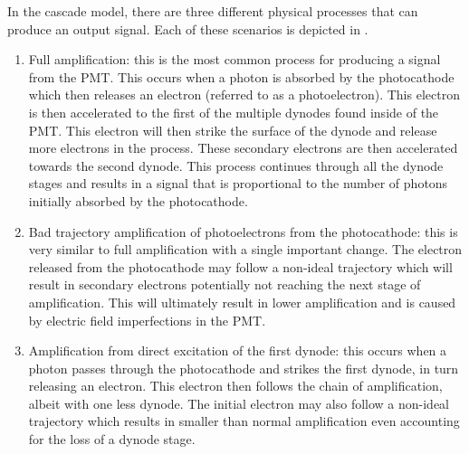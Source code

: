 In the cascade model, there are three different physical processes that can produce an output signal.  Each of these scenarios is depicted in .
\begin{enumerate}
	\item Full amplification: this is the most common process for producing a signal from the PMT.  This occurs when a photon is absorbed by the photocathode which then releases an electron (referred to as a photoelectron).  This electron is then accelerated to the first of the multiple dynodes found inside of the PMT.  This electron will then strike the surface of the dynode and release more electrons in the process.  These secondary electrons are then accelerated towards the second dynode.  This process continues through all the dynode stages and results in a signal that is proportional to the number of photons initially absorbed by the photocathode.
    \item Bad trajectory amplification of photoelectrons from the photocathode: this is very similar to full amplification with a single important change.  The electron released from the photocathode may follow a non-ideal trajectory which will result in secondary electrons potentially not reaching the next stage of amplification.  This will ultimately result in lower amplification and is caused by electric field imperfections in the PMT.  
    \item Amplification from direct excitation of the first dynode: this occurs when a photon passes through the photocathode and strikes the first dynode, in turn releasing an electron.  This electron then follows the chain of amplification, albeit with one less dynode.  The initial electron may also follow a non-ideal trajectory which results in smaller than normal amplification even accounting for the loss of a dynode stage.
\end{enumerate}

